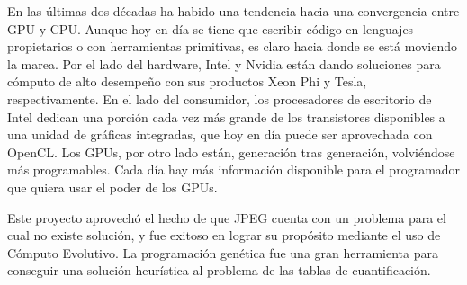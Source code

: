 En las últimas dos décadas ha habido una tendencia hacia una convergencia entre
GPU y CPU. Aunque hoy en día se tiene que escribir código en lenguajes
propietarios o con herramientas primitivas, es claro hacia donde se está
moviendo la marea. Por el lado del hardware, Intel y Nvidia están dando
soluciones para cómputo de alto desempeño con sus productos Xeon Phi y Tesla,
respectivamente. En el lado del consumidor, los procesadores de escritorio de
Intel dedican una porción cada vez más grande de los transistores disponibles a
una unidad de gráficas integradas, que hoy en día puede ser aprovechada con
OpenCL. Los GPUs, por otro lado están, generación tras generación, volviéndose
más programables. Cada día hay más información disponible para el programador
que quiera usar el poder de los GPUs.

Este proyecto aprovechó el hecho de que JPEG cuenta con un problema para el
cual no existe solución, y fue exitoso en lograr su propósito mediante el uso
de \gls{Cómputo Evolutivo}. La programación genética fue una gran herramienta
para conseguir una solución heurística al problema de las tablas de
cuantificación.

